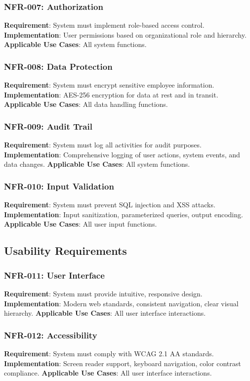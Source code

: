 \documentclass[12pt,a4paper]{article}
\begin{document}
\subsubsection{NFR-007: Authorization}
\textbf{Requirement}: System must implement role-based access control.
\textbf{Implementation}: User permissions based on organizational role and hierarchy.
\textbf{Applicable Use Cases}: All system functions.

\subsubsection{NFR-008: Data Protection}
\textbf{Requirement}: System must encrypt sensitive employee information.
\textbf{Implementation}: AES-256 encryption for data at rest and in transit.
\textbf{Applicable Use Cases}: All data handling functions.

\subsubsection{NFR-009: Audit Trail}
\textbf{Requirement}: System must log all activities for audit purposes.
\textbf{Implementation}: Comprehensive logging of user actions, system events, and data changes.
\textbf{Applicable Use Cases}: All system functions.

\subsubsection{NFR-010: Input Validation}
\textbf{Requirement}: System must prevent SQL injection and XSS attacks.
\textbf{Implementation}: Input sanitization, parameterized queries, output encoding.
\textbf{Applicable Use Cases}: All user input functions.

\subsection{Usability Requirements}

\subsubsection{NFR-011: User Interface}
\textbf{Requirement}: System must provide intuitive, responsive design.
\textbf{Implementation}: Modern web standards, consistent navigation, clear visual hierarchy.
\textbf{Applicable Use Cases}: All user interface interactions.

\subsubsection{NFR-012: Accessibility}
\textbf{Requirement}: System must comply with WCAG 2.1 AA standards.
\textbf{Implementation}: Screen reader support, keyboard navigation, color contrast compliance.
\textbf{Applicable Use Cases}: All user interface interactions.
\end{document}
